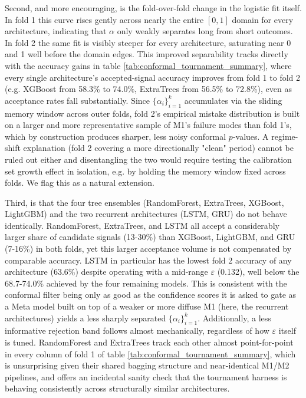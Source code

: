 \documentclass[12pt, a4paper]{article}
\begin{document}
Second, and more encouraging, is the fold-over-fold change in the logistic fit itself. In fold 1 this curve rises gently across nearly the entire 
$[0,1]$ domain for every architecture, indicating that $\alpha$ only weakly separates long from short outcomes. In fold 2 the same fit is visibly steeper for every architecture, 
saturating near 0 and 1 well before the domain edges. This improved separability tracks directly with the accuracy gains in table \ref{tab:conformal_tournament_summary}, where every 
single architecture's accepted-signal accuracy improves from fold 1 to fold 2 (e.g. XGBoost from 58.3\% to 74.0\%, ExtraTrees from 56.5\% to 72.8\%), even as acceptance rates 
fall substantially. Since \( \{\alpha_i\}_{i=1}^{k} \) accumulates via the sliding memory window across outer folds, 
fold 2's empirical mistake distribution is built on a larger and more representative sample of M1's failure modes than fold 1's, which by construction produces sharper, 
less noisy conformal $p$-values. A regime-shift explanation (fold 2 covering a more directionally "clean" period) cannot be ruled out either and disentangling the two would 
require testing the calibration set growth effect in isolation, e.g. by holding the memory window fixed across folds. We flag this as a natural extension.

\medskip

Third, is that the four tree ensembles (RandomForest, ExtraTrees, XGBoost, LightGBM) and the two recurrent architectures (LSTM, GRU) do not behave 
identically. RandomForest, ExtraTrees, and LSTM all accept a considerably larger share of candidate signals (13-30\%) than XGBoost, LightGBM, and GRU (7-16\%) in both folds, 
yet this larger acceptance volume is not compensated by comparable accuracy. LSTM in particular has the lowest fold 2 accuracy of any architecture (63.6\%) despite operating 
with a mid-range $\varepsilon$ (0.132), well below the 68.7-74.0\% achieved by the four remaining models. This is consistent with the conformal filter being only as good as the 
confidence scores it is asked to gate as a Meta model built on top of a weaker or more diffuse M1 (here, the recurrent architectures) yields a less sharply separated 
\( \{\alpha_i\}_{i=1}^{k} \). Additionally, a less informative rejection band follows almost mechanically, regardless of how $\varepsilon$ itself is tuned. RandomForest and 
ExtraTrees track each other almost point-for-point in every column of fold 1 of table \ref{tab:conformal_tournament_summary}, which is unsurprising given their shared bagging structure 
and near-identical M1/M2 pipelines, and offers an incidental sanity check that the tournament harness is behaving consistently across structurally similar architectures.
\end{document}
